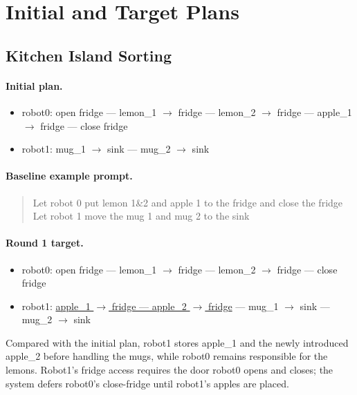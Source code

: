 
\section{Initial and Target Plans}
\label{app:revision-scripts}

\subsection{Kitchen Island Sorting}

\paragraph{Initial plan.}
\begin{itemize}
    \item robot0: open fridge --- lemon\_1 $\rightarrow$ fridge --- lemon\_2 $\rightarrow$ fridge --- apple\_1 $\rightarrow$ fridge --- close fridge
    \item robot1: mug\_1 $\rightarrow$ sink --- mug\_2 $\rightarrow$ sink
\end{itemize}
\paragraph{Baseline example prompt.}
\begin{quote}\small\ttfamily
Let robot 0 put lemon 1\&2 and apple 1 to the fridge and close the fridge\\
Let robot 1 move the mug 1 and mug 2 to the sink
\end{quote}

\paragraph{Round 1 target.}
\begin{itemize}
    \item robot0: open fridge --- lemon\_1 $\rightarrow$ fridge --- lemon\_2 $\rightarrow$ fridge --- close fridge
    \item robot1: \underline{apple\_1 $\rightarrow$ fridge --- apple\_2 $\rightarrow$ fridge} --- mug\_1 $\rightarrow$ sink --- mug\_2 $\rightarrow$ sink
\end{itemize}
Compared with the initial plan, robot1 stores apple\_1 and the newly introduced apple\_2 before handling the mugs, while robot0 remains responsible for the lemons.
Robot1's fridge access requires the door robot0 opens and closes; the system defers robot0's close-fridge until robot1's apples are placed.
